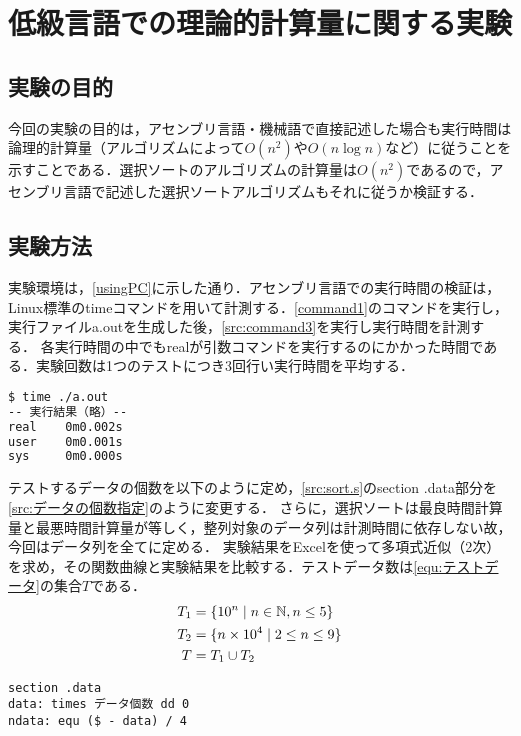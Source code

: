 \chapter{低級言語での理論的計算量に関する実験}\label{chap:時間計測}
\section{実験の目的}
今回の実験の目的は，アセンブリ言語・機械語で直接記述した場合も実行時間は論理的計算量（アルゴリズムによって\(O(n^2)\)や\(O(n\log n)\)など）に従うことを示すことである．選択ソートのアルゴリズムの計算量は\(O(n^2)\)である\cite[p.50,51]{アルゴリズムとデータ構造}ので，アセンブリ言語で記述した選択ソートアルゴリズムもそれに従うか検証する．
\section{実験方法}\label{sec:時間計測}
実験環境は，\ref{usingPC}に示した通り．アセンブリ言語での実行時間の検証は，Linux標準の{\ttfamily time}コマンドを用いて計測する．\ref{command1}のコマンドを実行し，実行ファイル{\ttfamily a.out}を生成した後，\ref{src:command3}を実行し実行時間を計測する．
各実行時間の中でも{\ttfamily real}が引数コマンドを実行するのにかかった時間である．実験回数は1つのテストにつき3回行い実行時間を平均する．
\begin{lstlisting}[language={Bash},caption={実行コマンド},label={src:command3},frame={single},numbers={none}]
$ time ./a.out
-- 実行結果（略）--
real    0m0.002s
user    0m0.001s
sys     0m0.000s
\end{lstlisting}
テストするデータの個数を以下のように定め，\ref{src:sort.s}の{\ttfamily section .data}部分を\ref{src:データの個数指定}のように変更する．
さらに，選択ソートは最良時間計算量と最悪時間計算量が等しく\cite[p.50]{アルゴリズムとデータ構造}，整列対象のデータ列は計測時間に依存しない故，今回はデータ列を全て{}に定める．
実験結果をExcelを使って多項式近似（2次）を求め，その関数曲線と実験結果を比較する．テストデータ数は\eqref{equ:テストデータ}の集合\(T\)である．
\begin{align}
    T_1 & =\{10^n\mid n\in\mathbb{N}, n\leq 5\} \notag \\
    T_2 & =\{n\times 10^4\mid 2\leq n\leq 9\}  \notag  \\
    T   & =T_1\cup T_2\label{equ:テストデータ}
\end{align}
\begin{lstlisting}[caption={データの個数指定}, label={src:データの個数指定},frame={single},numbers={none}]
    section .data
data: times データ個数 dd 0
ndata: equ ($ - data) / 4
\end{lstlisting}
